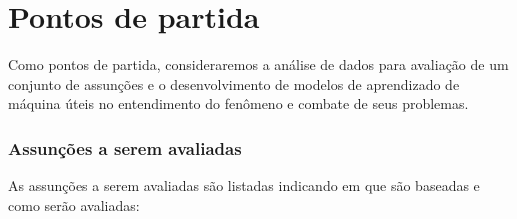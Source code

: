 \chapter{Pontos de partida}

Como pontos de partida, consideraremos a análise de dados para avaliação de um conjunto de assunções e o desenvolvimento de modelos de aprendizado de máquina úteis no entendimento do fenômeno e combate de seus problemas.

\subsection*{Assunções a serem avaliadas}

As assunções a serem avaliadas são listadas indicando em que são baseadas e como serão avaliadas:

